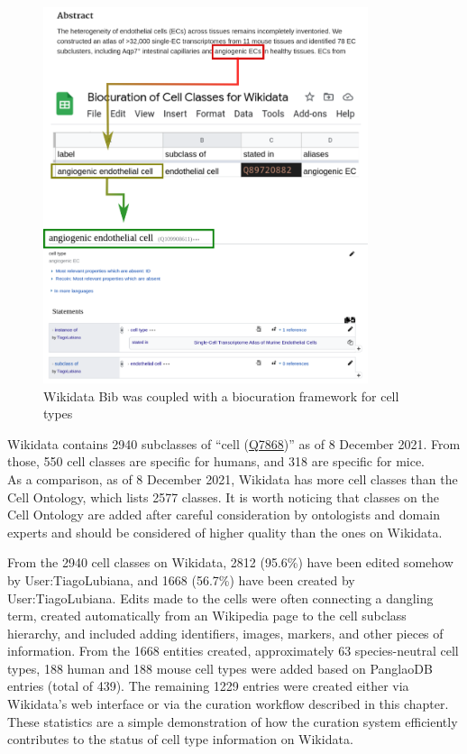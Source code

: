 \begin{figure}
\hypertarget{fig:biocuration_of_cells}{%
\centering
\includegraphics[width=0.85\textwidth,height=\textheight]{images/biocuration_of_cells.png}
\caption{Wikidata Bib was coupled with a biocuration framework for cell types}\label{fig:biocuration_of_cells}
}
\end{figure}

Wikidata contains 2940 subclasses of ``cell (\href{https://www.wikidata.org/wiki/Q7868}{Q7868})'' as of 8 December 2021.
From those, 550 cell classes are specific for humans, and 318 are specific for mice.\\
As a comparison, as of 8 December 2021, Wikidata has more cell classes than the Cell Ontology, which lists 2577 classes.
It is worth noticing that classes on the Cell Ontology are added after careful consideration by ontologists and domain experts and should be considered of higher quality than the ones on Wikidata.

From the 2940 cell classes on Wikidata, 2812 (95.6\%) have been edited somehow by User:TiagoLubiana, and 1668 (56.7\%) have been created by User:TiagoLubiana.
Edits made to the cells were often connecting a dangling term, created automatically from an Wikipedia page to the cell subclass hierarchy, and included adding identifiers, images, markers, and other pieces of information.
From the 1668 entities created, approximately 63 species-neutral cell types, 188 human and 188 mouse cell types were added based on PanglaoDB entries (total of 439).
The remaining 1229 entries were created either via Wikidata's web interface or via the curation workflow described in this chapter.
These statistics are a simple demonstration of how the curation system efficiently contributes to the status of cell type information on Wikidata.

